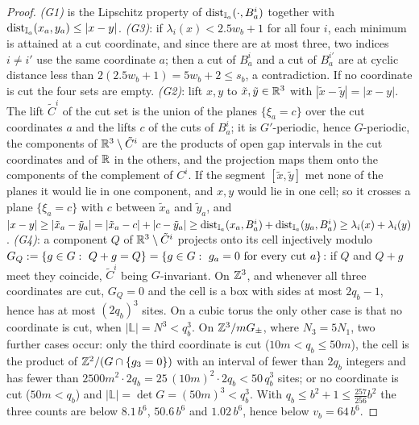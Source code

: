 \begin{proof}
\emph{(G1)} is the Lipschitz property of $\operatorname{dist}_{\mathbb I_a}(\cdot,B^i_a)$ together with $\operatorname{dist}_{\mathbb I_a}(x_a,y_a)\le|x-y|$. \emph{(G3)}: if $\lambda_i(x)<2.5w_b+1$ for all four $i$, each minimum is attained at a cut coordinate, and since there are at most three, two indices $i\ne i'$ use the same coordinate $a$; then a cut of $B^i_a$ and a cut of $B^{i'}_a$ are at cyclic distance less than $2(2.5w_b+1)=5w_b+2\le s_b$, a contradiction. If no coordinate is cut the four sets are empty. \emph{(G2)}: lift $x,y$ to $\tilde x,\tilde y\in\mathbb R^3$ with $|\tilde x-\tilde y|=|x-y|$. The lift $\tilde C^i$ of the cut set is the union of the planes $\{\xi_a=c\}$ over the cut coordinates $a$ and the lifts $c$ of the cuts of $B^i_a$; it is $G'$-periodic, hence $G$-periodic, the components of $\mathbb R^3\setminus\tilde C^i$ are the products of open gap intervals in the cut coordinates and of $\mathbb R$ in the others, and the projection maps them onto the components of the complement of $C^i$. If the segment $[\tilde x,\tilde y]$ met none of the planes it would lie in one component, and $x,y$ would lie in one cell; so it crosses a plane $\{\xi_a=c\}$ with $c$ between $\tilde x_a$ and $\tilde y_a$, and $|x-y|\ge|\tilde x_a-\tilde y_a|=|\tilde x_a-c|+|c-\tilde y_a|\ge\operatorname{dist}_{\mathbb I_a}(x_a,B^i_a)+\operatorname{dist}_{\mathbb I_a}(y_a,B^i_a)\ge\lambda_i(x)+\lambda_i(y)$. \emph{(G4)}: a component $Q$ of $\mathbb R^3\setminus\tilde C^i$ projects onto its cell injectively modulo $G_Q:=\{g\in G:\ Q+g=Q\}=\{g\in G:\ g_a=0\text{ for every cut }a\}$: if $Q$ and $Q+g$ meet they coincide, $\tilde C^i$ being $G$-invariant. On $\mathbb Z^3$, and whenever all three coordinates are cut, $G_Q=0$ and the cell is a box with sides at most $2q_b-1$, hence has at most $(2q_b)^3$ sites. On a cubic torus the only other case is that no coordinate is cut, when $|\mathbb{L}|=N^3<q_b^3$. On $\mathbb Z^3/mG_\pm$, where $N_3=5N_1$, two further cases occur: only the third coordinate is cut ($10m<q_b\le50m$), the cell is the product of $\mathbb Z^2/(G\cap\{g_3=0\})$ with an interval of fewer than $2q_b$ integers and has fewer than $2500m^2\cdot2q_b=25\,(10m)^2\cdot2q_b<50\,q_b^3$ sites; or no coordinate is cut ($50m<q_b$) and $|\mathbb{L}|=\det G=(50m)^3<q_b^3$. With $q_b\le b^2+1\le\frac{257}{256}b^2$ the three counts are below $8.1\,b^6$, $50.6\,b^6$ and $1.02\,b^6$, hence below $v_b=64\,b^6$.
\end{proof}

